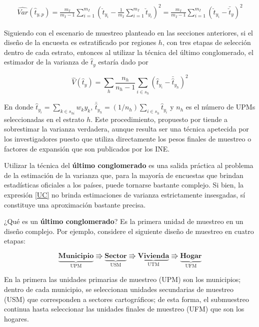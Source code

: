 \documentclass[12pt,spanish,]{book}
\begin{document}
\begin{align}
\label{UC}
\widehat{Var}(\hat{t}_{y,p})
=\frac{m_I}{m_I-1}\sum_{i=1}^{m_I}\left( \breve{t}_{y_i} -\frac{1}{m_I}\sum_{i=1}^{m_I}\breve{t}_{y_i} \right)^2 
=\frac{m_I}{m_I-1}\sum_{i=1}^{m_I}\left( \breve{t}_{y_i} - \bar{\breve{t}}_{y} \right)^2
\end{align}

Siguiendo con el escenario de muestreo planteado en las secciones anteriores, si el diseño de la encuesta es estratificado por regiones \(h\), con tres etapas de selección dentro de cada estrato, entonces al utilizar la técnica del último conglomerado, el estimador de la varianza de \(\hat{t}_{y}\) estaría dado por

\[
\hat{V}(\hat{t}_{y}) = 
\sum_h\frac{n_h}{n_h-1}\sum_{i\in s_h}\left(\hat{t}_{y_i}-\bar{\hat{t}}_{y_h}\right)^2
\]

En donde \(\hat{t}_{y_i} = \sum_{k \in s_{hi}} w_k y_k\), \(\bar{\hat{t}}_{y_h}=(1/n_h)\sum_{i \in s_h}\hat{t}_{y_i}\) y \(n_h\) es el número de UPMs seleccionadas en el estrato \(h\). Este procedimiento, propuesto por \textcite{hansen1953sample} tiende a sobrestimar la varianza verdadera, aunque resulta ser una técnica apetecida por los investigadores puesto que utiliza directamente los pesos finales de muestreo o factores de expansión que son publicados por los INE.

Utilizar la técnica del \textbf{último conglomerado} es una salida práctica al problema de la estimación de la varianza que, para la mayoría de encuestas que brindan estadísticas oficiales a los países, puede tornarse bastante complejo. Si bien, la expresión \eqref{UC} no brinda estimaciones de varianza estrictamente insesgadas, sí constituye una aproximación bastante precisa.

¿Qué es un \textbf{último conglomerado}? Es la primera unidad de muestreo en un diseño complejo. Por ejemplo, considere el siguiente diseño de muestreo en cuatro etapas:

\begin{equation*}
\underbrace{\textbf{Municipio}}_{\text{UPM}} \Rrightarrow
\underbrace{\textbf{Sector}}_{\text{USM}} \Rrightarrow
\underbrace{\textbf{Vivienda}}_{\text{UTM}} \Rrightarrow
\underbrace{\textbf{Hogar}}_{\text{UFM}}
\end{equation*}

En la primera las unidades primarias de muestreo (UPM) son los municipios; dentro de cada municipio, se seleccionan unidades secundarias de muestreo (USM) que corresponden a sectores cartográficos; de esta forma, el submuestreo continua hasta seleccionar las unidades finales de muestreo (UFM) que son los hogares.
\end{document}
